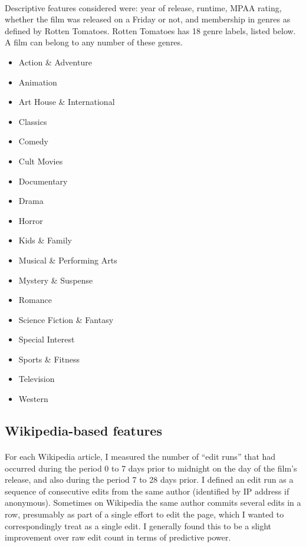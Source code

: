 \documentclass[10pt]{article}
\begin{document}
    \paragraph{}
    Descriptive features considered were: year of release, runtime, MPAA rating, whether the film was released on a Friday or not, and membership in genres as defined by Rotten Tomatoes. Rotten Tomatoes has 18 genre labels, listed below. A film can belong to any number of these genres. 
    
    \begin{multicols}{3}
        \begin{itemize}
            \footnotesize
            \singlespacing
            \item Action \& Adventure
            \item Animation
            \item Art House \& International
            \item Classics
            \item Comedy
            \item Cult Movies
            \item Documentary
            \item Drama
            \item Horror
            \item Kids \& Family
            \item Musical \& Performing Arts
            \item Mystery \& Suspense
            \item Romance
            \item Science Fiction \& Fantasy
            \item Special Interest
            \item Sports \& Fitness
            \item Television
            \item Western
        \end{itemize}
    \end{multicols}
    
    \subsection{Wikipedia-based features}
    
    \paragraph{}
    For each Wikipedia article, I measured the number of ``edit runs'' that had occurred during the period 0 to 7 days prior to midnight on the day of the film's release, and also during the period 7 to 28 days prior. I defined an edit run as a sequence of consecutive edits from the same author (identified by IP address if anonymous). Sometimes on Wikipedia the same author commits several edits in a row, presumably as part of a single effort to edit the page, which I wanted to correspondingly treat as a single edit. I generally found this to be a slight improvement over raw edit count in terms of predictive power.
    
\end{document}
